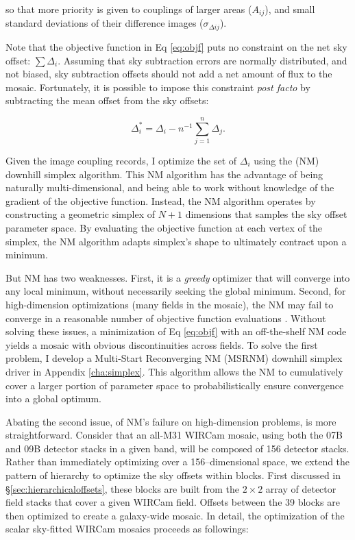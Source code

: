 \documentclass[iop]{emulateapj}
\begin{document}
\noindent so that more priority is given to couplings of larger areas ($A_{ij}$), and small standard deviations of their difference images ($\sigma_{\Delta ij}$).

Note that the objective function in Eq \ref{eq:objf} puts no constraint on the net sky offset: $\sum \Delta_i$. Assuming that sky subtraction errors are normally distributed, and not biased, sky subtraction offsets should not add a net amount of flux to the mosaic. Fortunately, it is possible to impose this constraint \textit{post facto} by subtracting the mean offset from the sky offsets:

\begin{equation}
    \Delta_i^* = \Delta_i - n^{-1}\sum_{j=1}^n \Delta_j.
    \label{eq:netzero}
\end{equation}

Given the image coupling records, I optimize the set of $\Delta_i$ using the \cite{Nelder:1965} (NM) downhill simplex algorithm. This NM algorithm has the advantage of being naturally multi-dimensional, and being able to work without knowledge of the gradient of the objective function. Instead, the NM algorithm operates by constructing a geometric simplex of $N+1$ dimensions that samples the sky offset parameter space. By evaluating the objective function at each vertex of the simplex, the NM algorithm adapts simplex's shape to ultimately contract upon a minimum.

But NM has two weaknesses. First, it is a \emph{greedy} optimizer that will converge into any local minimum, without necessarily seeking the global minimum. Second, for high-dimension optimizations (many fields in the mosaic), the NM may fail to converge in a reasonable number of objective function evaluations \citep{Neumann:2006}. Without solving these issues, a minimization of Eq \ref{eq:objf} with an off-the-shelf NM code yields a mosaic with obvious discontinuities across fields. To solve the first problem, I develop a Multi-Start Reconverging NM (MSRNM) downhill simplex driver in Appendix \ref{cha:simplex}. This algorithm allows the NM to cumulatively cover a larger portion of parameter space to probabilistically ensure convergence into a global optimum.

Abating the second issue, of NM's failure on high-dimension problems, is more straightforward. Consider that an all-M31 WIRCam mosaic, using both the 07B and 09B detector stacks in a given band, will be composed of
156 detector stacks. Rather than immediately optimizing over a 156--dimensional space, we extend the pattern of hierarchy to optimize the sky offsets within blocks. First discussed in \S\ref{sec:hierarchicaloffsets}, these blocks are built from the $2\times 2$ array of detector field stacks that cover a given WIRCam field. Offsets between the 39 blocks are then optimized to create a galaxy-wide mosaic. In detail, the optimization of the scalar sky-fitted WIRCam mosaics proceeds as followings:
\end{document}
